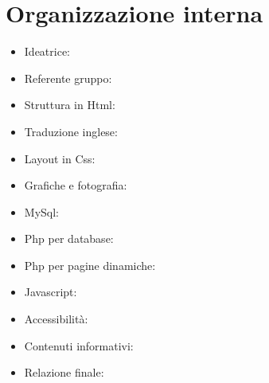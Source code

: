 \section{Organizzazione interna}
\begin{itemize}
\item Ideatrice: 
\item Referente gruppo: 
\item Struttura in Html:
\item Traduzione inglese:  
\item Layout in Css:
\item Grafiche e fotografia:
\item MySql:
\item Php per database:
\item Php per pagine dinamiche:
\item Javascript: 
\item Accessibilità:
\item Contenuti informativi:
\item Relazione finale: 
\end{itemize}
